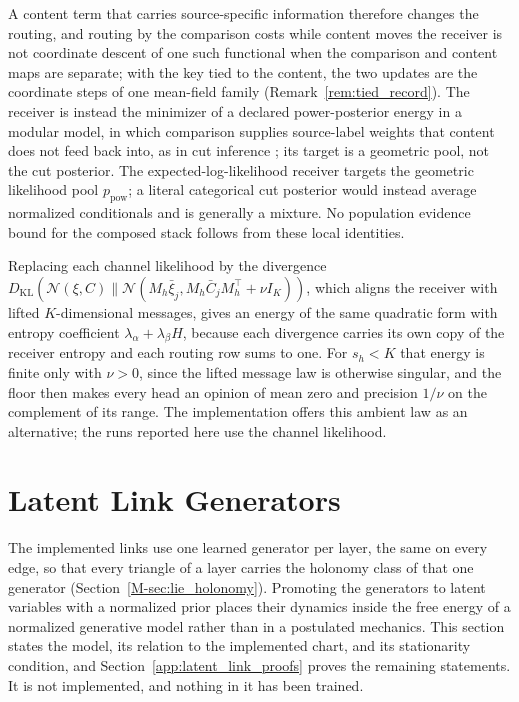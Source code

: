 \documentclass[twoside,11pt]{article}
\begin{document}
A content term that carries source-specific information therefore changes the routing, and routing by the comparison costs while content moves the receiver is not coordinate descent of one such functional when the comparison and content maps are separate; with the key tied to the content, the two updates are the coordinate steps of one mean-field family (Remark~\ref{rem:tied_record}). The receiver is instead the minimizer of a declared power-posterior energy in a modular model, in which comparison supplies source-label weights that content does not feed back into, as in cut inference \citep{Plummer2015}; its target is a geometric pool, not the cut posterior. The expected-log-likelihood receiver targets the geometric likelihood pool $p_{\mathrm{pow}}$; a literal categorical cut posterior would instead average normalized conditionals and is generally a mixture. No population evidence bound for the composed stack follows from these local identities.

Replacing each channel likelihood by the divergence $D_{\mathrm{KL}}(\mathcal N(\xi,C)\|\mathcal N(M_h\bar\xi_j,M_h\bar C_jM_h^\top+\nu I_K))$, which aligns the receiver with lifted $K$-dimensional messages, gives an energy of the same quadratic form with entropy coefficient $\lambda_\alpha+\lambda_\beta H$, because each divergence carries its own copy of the receiver entropy and each routing row sums to one. For $s_h<K$ that energy is finite only with $\nu>0$, since the lifted message law is otherwise singular, and the floor then makes every head an opinion of mean zero and precision $1/\nu$ on the complement of its range. The implementation offers this ambient law as an alternative; the runs reported here use the channel likelihood.

\section{Latent Link Generators}
\label{sec:latent_links}

The implemented links use one learned generator per layer, the same on every edge, so that every triangle of a layer carries the holonomy class of that one generator (Section~\ref{M-sec:lie_holonomy}). Promoting the generators to latent variables with a normalized prior places their dynamics inside the free energy of a normalized generative model rather than in a postulated mechanics. This section states the model, its relation to the implemented chart, and its stationarity condition, and Section~\ref{app:latent_link_proofs} proves the remaining statements. It is not implemented, and nothing in it has been trained.
\end{document}
